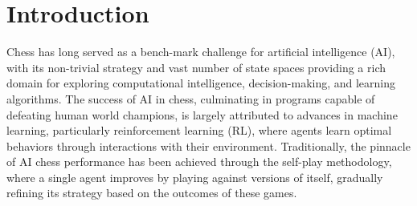\documentclass[journal]{IEEEtran}
\begin{document}
	\section{Introduction}
	\label{sec:introduction}
	Chess has long served as a bench-mark challenge for artificial intelligence (AI),
	with its non-trivial strategy and vast number of state spaces providing a rich domain for exploring 
	computational intelligence, decision-making, and learning algorithms. 
	The success of AI in chess, culminating in programs capable of defeating human world champions, 
	is largely attributed to advances in machine learning, particularly reinforcement learning (RL), 
	where agents learn optimal behaviors through interactions with their environment. 
	Traditionally, the pinnacle of AI chess performance has been achieved through the self-play methodology, 
	where a single agent improves by playing against versions of itself, gradually refining its strategy based on the outcomes of these games.
	
\end{document}
